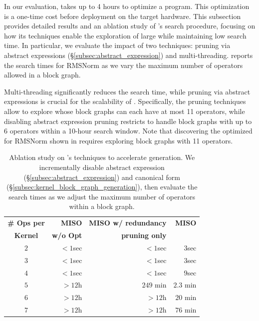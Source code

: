 In our evaluation, \sys takes up to 4 hours to optimize a \lax program. This optimization is a one-time cost before deployment on the target hardware.
This subsection provides detailed results and an ablation study of \sys's search procedure, focusing on how its techniques enable the exploration of large \graphs while maintaining low search time.
%
In particular, we evaluate the impact of two techniques: pruning via abstract expressions (\S\ref{subsec:abstract_expression}) and multi-threading.
%
 reports the search times for RMSNorm as we vary the maximum number of operators allowed in a block graph.

Multi-threading significantly reduces the search time, while pruning via abstract expressions is crucial for the scalability of \sys.
%
Specifically, the pruning techniques allow \sys to explore \graphs whose block graphs can each have at most 11 operators, while disabling abstract expression pruning restricts \sys to handle block graphs with up to 6 operators within a 10-hour search window.
%
Note that discovering the optimized \graph for RMSNorm shown in  requires exploring block graphs with 11 operators.


\begin{table}
    \centering
    \caption{Ablation study on \sys's techniques to accelerate \graph generation. We incrementally disable abstract expression (\S\ref{subsec:abstract_expression}) and canonical form (\S\ref{subsec:kernel_block_graph_generation}), then evaluate the search times as we adjust the maximum number of operators within a block graph.}
    \vspace{\captionvspace}
    \small
    \label{tab:search_time}
    \begin{tabular}{c|r|r|r}
    \toprule
    {\bf \# Ops per} & {\bf MISO} & {\bf MISO w/ redundancy} & {\bf MISO}\\
    {\bf Kernel} & {\bf w/o Opt} & {\bf  pruning only} & {\bf }\\
    \midrule
    $2$ & $< 1$sec & $< 1$sec & $3$sec \\
    $3$ & $< 1$sec & $< 1$sec & $3$sec \\
    $4$ & $< 1$sec & $< 1$sec & $9$sec \\
    $5$ & $> 12$h & $249$ min & $2.3$ min \\
    $6$ & $> 12$h & $> 12$h & $20$ min \\
    $7$ & $> 12$h & $> 12$h & $76$ min \\
    \bottomrule
    \end{tabular}
\end{table}
\fi 

